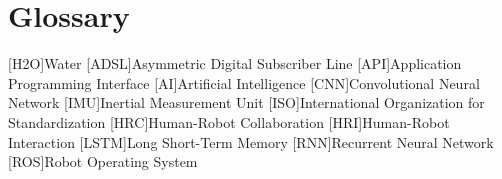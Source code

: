 \chapter{Glossary}

\footnotesize
\SingleSpacing

\begin{multicols}{2}
\begin{acronym}[AAAAAA]

	[H2O]{Water}
	[ADSL]{Asymmetric Digital Subscriber Line}
    [API]{Application Programming Interface}
    [AI]{Artificial Intelligence}
    [CNN]{Convolutional Neural Network}
    [IMU]{Inertial Measurement Unit}
    [ISO]{International Organization for Standardization}
    [HRC]{Human-Robot Collaboration}
    [HRI]{Human-Robot Interaction}
    [LSTM]{Long Short-Term Memory}
    [RNN]{Recurrent Neural Network}
    [ROS]{Robot Operating System}

\end{acronym}
\end{multicols}
